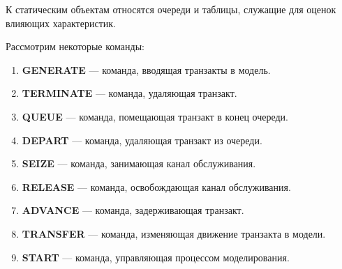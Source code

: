 К статическим объектам относятся очереди и таблицы, служащие
для оценок влияющих характеристик.

Рассмотрим некоторые команды:
\begin{enumerate}
	\item \textbf{GENERATE} --- команда, вводящая транзакты в модель.
	\item \textbf{TERMINATE} ---  команда, удаляющая транзакт.
	\item \textbf{QUEUE} --- команда, помещающая транзакт в конец очереди.
	\item \textbf{DEPART} --- команда, удаляющая транзакт из очереди.
	\item \textbf{SEIZE} --- команда, занимающая канал обслуживания.
	\item \textbf{RELEASE} --- команда, освобождающая канал обслуживания.
	\item \textbf{ADVANCE} ---  команда, задерживающая транзакт.
	\item \textbf{TRANSFER} --- команда, изменяющая движение транзакта в модели.
	\item \textbf{START} --- команда, управляющая процессом моделирования.
\end{enumerate}